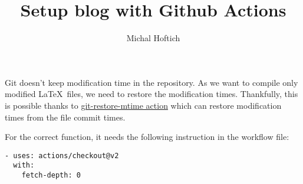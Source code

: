 \documentclass{article}
\title{Setup blog with Github Actions}
\author{Michal Hoftich}
\begin{document}
\maketitle

Git doesn't keep modification time in the repository. As we want to compile only modified
\LaTeX\ files, we need to restore the modification times. 
Thankfully, this is possible thanks to 
\href{https://github.com/chetan/git-restore-mtime-action}{git-restore-mtime action}
which can restore modification times from the file commit times.

For the correct function, it needs the following instruction in the workflow file:

\begin{verbatim}
- uses: actions/checkout@v2
  with:
    fetch-depth: 0
\end{verbatim}
\end{document}
